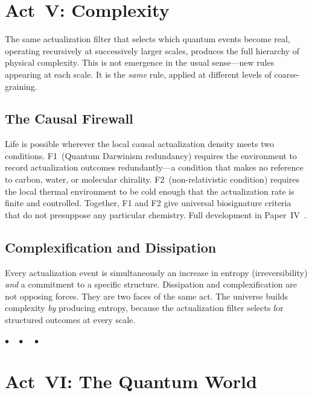 \documentclass[12pt,a4paper]{article}
\begin{document}
\section{Act~V: Complexity}

The same actualization filter that selects which quantum events become real, operating recursively at successively larger scales, produces the full hierarchy of physical complexity. This is not emergence in the usual sense---new rules appearing at each scale. It is the \emph{same} rule, applied at different levels of coarse-graining.

\subsection{The Causal Firewall}

Life is possible wherever the local causal actualization density meets two conditions. F1~(Quantum Darwinism redundancy) requires the environment to record actualization outcomes redundantly---a condition that makes no reference to carbon, water, or molecular chirality. F2~(non-relativistic condition) requires the local thermal environment to be cold enough that the actualization rate is finite and controlled. Together, F1 and F2 give universal biosignature criteria that do not presuppose any particular chemistry. Full development in Paper~IV~\cite{P4}.

\subsection{Complexification and Dissipation}

Every actualization event is simultaneously an increase in entropy (irreversibility) \emph{and} a commitment to a specific structure. Dissipation and complexification are not opposing forces. They are two faces of the same act. The universe builds complexity \emph{by} producing entropy, because the actualization filter selects for structured outcomes at every scale.

\bigskip\begin{center}$\bullet\quad\bullet\quad\bullet$\end{center}\bigskip

\section{Act~VI: The Quantum World}
\end{document}
